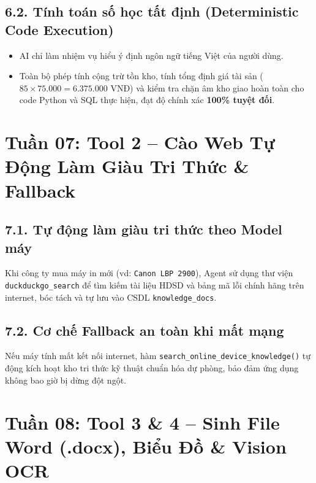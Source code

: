 \documentclass[11pt,a4paper]{article}
\begin{document}
\subsection{6.2. Tính toán số học tất định (Deterministic Code Execution)}
\begin{itemize}
    \item AI chỉ làm nhiệm vụ hiểu ý định ngôn ngữ tiếng Việt của người dùng.
    \item Toàn bộ phép tính cộng trừ tồn kho, tính tổng định giá tài sản ($85 \times 75.000 = 6.375.000$ VNĐ) và kiểm tra chặn âm kho giao hoàn toàn cho code Python và SQL thực hiện, đạt độ chính xác \textbf{100\% tuyệt đối}.
\end{itemize}

\section{Tuần 07: Tool 2 -- Cào Web Tự Động Làm Giàu Tri Thức \& Fallback}

\subsection{7.1. Tự động làm giàu tri thức theo Model máy}
Khi công ty mua máy in mới (vd: \texttt{Canon LBP 2900}), Agent sử dụng thư viện \texttt{duckduckgo\_search} để tìm kiếm tài liệu HDSD và bảng mã lỗi chính hãng trên internet, bóc tách và tự lưu vào CSDL \texttt{knowledge\_docs}.

\subsection{7.2. Cơ chế Fallback an toàn khi mất mạng}
Nếu máy tính mất kết nối internet, hàm \texttt{search\_online\_device\_knowledge()} tự động kích hoạt kho tri thức kỹ thuật chuẩn hóa dự phòng, bảo đảm ứng dụng không bao giờ bị dừng đột ngột.

\section{Tuần 08: Tool 3 \& 4 -- Sinh File Word (.docx), Biểu Đồ \& Vision OCR}
\end{document}
